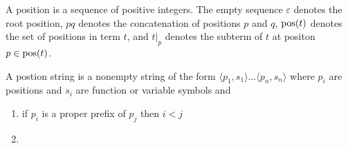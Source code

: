 \documentclass[ 
xcolor={usenames,dvipsnames,svgnames,tablem} 
,handout
]{beamer}
\begin{document}
\begin{frame}
\begin{definition}
A position is a sequence of positive integers.
The empty sequence $\varepsilon$ denotes the root position,
$pq$ denotes the concatenation of positions $p$ and $q$,
$\operatorname{pos}(t)$ denotes the set of positions in term $t$, and $t|_p$ denotes the subterm of $t$ at positon $p\in\operatorname{pos}(t)$.
\end{definition}

\begin{definition}
A postion string is a nonempty string of the form $\langle p_1,s_1\rangle\ldots\langle p_n,s_n\rangle$
where $p_i$ are positions and $s_i$ are function or variable symbols and
\begin{enumerate}
\item
if $p_i$ is a proper prefix of $p_j$ then $i<j$
\item
\end{enumerate}
\end{definition}
\end{frame}

\begin{frame}
\begin{definition}

\end{definition}
\end{frame}

\end{document}
